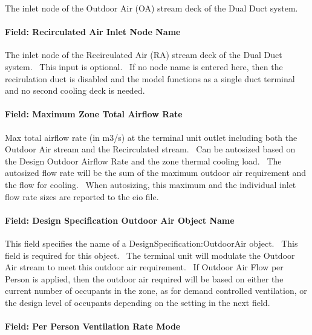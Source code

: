 The inlet node of the Outdoor Air (OA) stream deck of the Dual Duct system.

\paragraph{Field: Recirculated Air Inlet Node Name}\label{field-recirculated-air-inlet-node-name}

The inlet node of the Recirculated Air (RA) stream deck of the Dual Duct system. ~This input is optional.~ If no node name is entered here, then the recirulation duct is disabled and the model functions as a single duct terminal and no second cooling deck is needed.

\paragraph{Field: Maximum Zone Total Airflow Rate}\label{field-maximum-zone-total-airflow-rate}

Max total airflow rate (in m3/s) at the terminal unit outlet including both the Outdoor Air stream and the Recirculated stream.~ Can be autosized based on the Design Outdoor Airflow Rate and the zone thermal cooling load.~ The autosized flow rate will be the sum of the maximum outdoor air requirement and the flow for cooling. ~When autosizing, this maximum and the individual inlet flow rate sizes are reported to the eio file.

\paragraph{Field: Design Specification Outdoor Air Object Name}\label{field-design-specification-outdoor-air-object-name-3}

This field specifies the name of a DesignSpecification:OutdoorAir object.~ This field is required for this object.~ The terminal unit will modulate the Outdoor Air stream to meet this outdoor air requirement.~ If Outdoor Air Flow per Person is applied, then the outdoor air required will be based on either the current number of occupants in the zone, as for demand controlled ventilation, or the design level of occupants depending on the setting in the next field.

\paragraph{Field: Per Person Ventilation Rate Mode}\label{field-per-person-ventilation-rate-mode}

